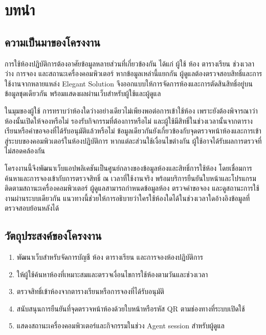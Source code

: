\documentclass[14pt,a4paper,oneside]{extreport}
\begin{document}
\chapter{บทนำ}
\section{ความเป็นมาของโครงงาน}
การใช้ห้องปฏิบัติการต้องอาศัยข้อมูลหลายส่วนที่เกี่ยวข้องกัน ได้แก่ ผู้ใช้ ห้อง ตารางเรียน ช่วงเวลาว่าง การจอง และสถานะเครื่องคอมพิวเตอร์ หากข้อมูลเหล่านี้แยกกัน ผู้ดูแลต้องตรวจสอบสิทธิ์และการใช้งานจากหลายแหล่ง Elegant Solution จึงออกแบบให้การจัดการห้องและการตัดสินสิทธิ์อยู่บนข้อมูลชุดเดียวกัน พร้อมแสดงผลผ่านเว็บสำหรับผู้ใช้และผู้ดูแล

ในมุมของผู้ใช้ การทราบว่าห้องใดว่างอย่างเดียวไม่เพียงพอต่อการเข้าใช้ห้อง เพราะยังต้องพิจารณาว่าห้องนั้นเปิดให้จองหรือไม่ รองรับกิจกรรมที่ต้องการหรือไม่ และผู้ใช้มีสิทธิ์ในช่วงเวลานั้นจากตารางเรียนหรือคำขอจองที่ได้รับอนุมัติแล้วหรือไม่ ข้อมูลเดียวกันยังเกี่ยวข้องกับจุดตรวจหน้าห้องและการเข้าสู่ระบบของคอมพิวเตอร์ในห้องปฏิบัติการ หากแต่ละส่วนใช้เงื่อนไขต่างกัน ผู้ใช้อาจได้รับผลการตรวจที่ไม่สอดคล้องกัน

โครงงานนี้จึงพัฒนาเว็บแอปพลิเคชันเป็นศูนย์กลางของข้อมูลห้องและสิทธิ์การใช้ห้อง โดยเชื่อมการค้นหาและการจองเข้ากับการตรวจสิทธิ์ ณ เวลาที่ใช้งานจริง พร้อมบริการยืนยันใบหน้าและโปรแกรมติดตามสถานะเครื่องคอมพิวเตอร์ ผู้ดูแลสามารถกำหนดข้อมูลห้อง ตรวจคำขอจอง และดูสถานะการใช้งานผ่านระบบเดียวกัน แนวทางนี้ช่วยให้การอธิบายว่าใครใช้ห้องใดได้ในช่วงเวลาใดอ้างอิงข้อมูลที่ตรวจสอบย้อนหลังได้

\section{วัตถุประสงค์ของโครงงาน}
\begin{enumerate}
\item พัฒนาเว็บสำหรับจัดการบัญชี ห้อง ตารางเรียน และการจองห้องปฏิบัติการ
\item ให้ผู้ใช้ค้นหาห้องที่เหมาะสมและตรวจเงื่อนไขการใช้ห้องตามวันและช่วงเวลา
\item ตรวจสิทธิ์เข้าห้องจากตารางเรียนหรือการจองที่ได้รับอนุมัติ
\item สนับสนุนการยืนยันที่จุดตรวจหน้าห้องด้วยใบหน้าหรือรหัส QR ตามช่องทางที่ระบบเปิดใช้
\item แสดงสถานะเครื่องคอมพิวเตอร์และกิจกรรมในช่วง Agent session สำหรับผู้ดูแล
\end{enumerate}
\end{document}
